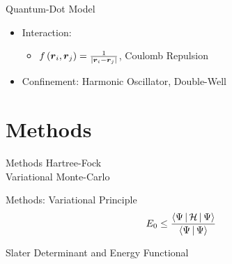 \documentclass[10pt, t]{beamer}
\newcommand{\twofigure}[2]{
    \begin{figure}[H]
        \centering
        \begin{subfigure}[b!]{0.49\textwidth}
            \centering
            \texttt{[image: \{\#1]}}
        \end{subfigure}
        \begin{subfigure}[b!]{0.49\textwidth}
            \centering
            \texttt{[image: \{\#2]}}
        \end{subfigure}
        \justify
    \end{figure}
} %
\begin{document}
\begin{frame}[fragile]{Quantum-Dot Model}
    \centering
    \begin{itemize}[<+->]
        \item Interaction:
            \begin{itemize}
                \item $f\left(\boldsymbol{{r}}_i, \boldsymbol{{r}}_j\right) =
                    \frac{1}{\abs{\boldsymbol{{r}}_i - \boldsymbol{{r}}_j}}$,\hspace{2cm} Coulomb Repulsion
            \end{itemize}
        \item<3-> Confinement: Harmonic
            Oscillator{},
            Double-Well{}
    \end{itemize}
    \onslide<4->{\vspace{-0.40cm}\twofigure{text/figs/HO2Dplot.pdf}{text/figs/DW2Dplot.pdf}}
\end{frame}

\section{Methods}

{
\begin{frame}[standout]{Methods}
    Hartree-Fock \\
    Variational Monte-Carlo
\end{frame}}

{
\begin{frame}[standout]{Methods: Variational Principle}
    \begin{equation*}
        E_0 \leq \frac{\Braket{\Psi|\mathcal{H}|\Psi}}{\Braket{\Psi|\Psi}}
        \label{eq:varPrinc}
    \end{equation*}
\end{frame}}

{
\begin{frame}[standout]
    Slater Determinant and Energy Functional
\end{frame}}
\end{document}
